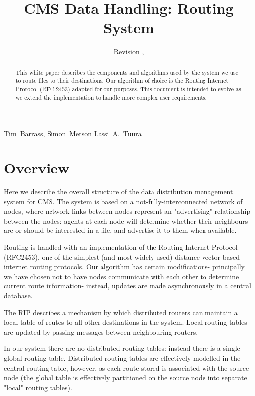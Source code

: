 \documentclass{cmspaper}
\begin{document}
\begin{titlepage}
  \whitepaper
  \date{Revision \RCSRevision, \RCSDate}
  \title{CMS Data Handling: Routing System}

  \begin{Authlist}
    Tim~Barrass, Simon~Metson
    Lassi~A.~Tuura
  \end{Authlist}

  \begin{abstract}
This white paper describes the components and algorithms used by the system we use to route files to their destinations.  Our algorithm of choice is the Routing Internet Protocol (RFC 2453) adapted for our purposes.  This document is intended to evolve as we extend the implementation to handle more complex user requirements.
  \end{abstract} 

\end{titlepage}

\setcounter{page}{2}

\section{Overview}
Here we describe the overall structure of the data distribution management system for CMS. The system is based on a not-fully-interconnected network of nodes, where network links between nodes represent an "advertising" relationship between the nodes: agents at each node will determine whether their neighbours are or should be interested in a file, and advertise it to them when available.

Routing is handled with an implementation of the Routing Internet Protocol (RFC2453), one of the simplest (and most widely used) distance vector based internet routing protocols. Our algorithm has certain modifications- principally we have chosen not to have nodes communicate with each other to determine current route information- instead, updates are made asynchronously in a central database.

The RIP describes a mechanism by which distributed routers can maintain a local table of routes to all other destinations in the system. Local routing tables are updated by passing messages between neighbouring routers.

In our system there are no distributed routing tables: instead there is a single global routing table. Distributed routing tables are effectively modelled in the central routing table, however, as each route stored is associated with the source node (the global table is effectively partitioned on the source node into separate "local" routing tables).
\end{document}
